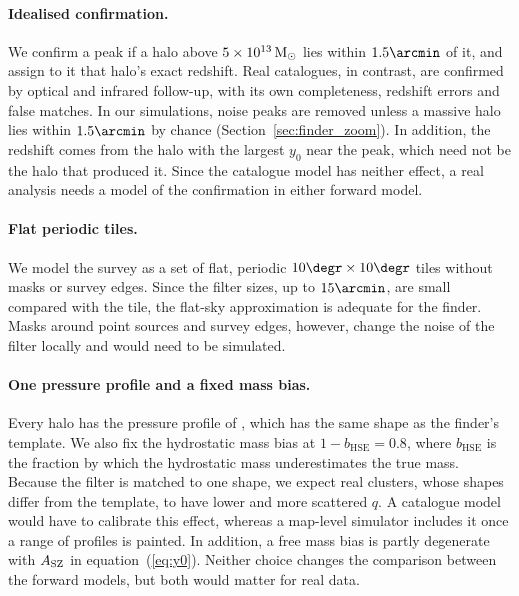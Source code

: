 \paragraph*{Idealised confirmation.} We confirm a peak if a halo above $5\times10^{13}\,\mathrm{M}_\odot$ lies within
$1.5\arcmin$ of it, and assign to it that halo's exact redshift. Real catalogues, in contrast, are
confirmed by optical and infrared follow-up, with its own completeness, redshift errors and false matches.
In our simulations, noise peaks are removed unless a massive halo lies within $1.5\arcmin$ by chance (Section~\ref{sec:finder_zoom}). In addition, the redshift comes from the halo with the largest $y_0$ near the peak,
which need not be the halo that produced it. Since the catalogue model has neither effect, a real analysis
needs a model of the confirmation in either forward model.

\paragraph*{Flat periodic tiles.} We model the survey as a set of flat, periodic $10\degr\times10\degr$
tiles without masks or survey edges. Since the filter sizes, up to $15\arcmin$, are small compared with the
tile, the flat-sky approximation is adequate for the finder. Masks around point sources and survey edges,
however, change the noise of the filter locally and would need to be simulated.

\paragraph*{One pressure profile and a fixed mass bias.} Every halo has the pressure profile of
\citet{Arnaud2010}, which has the same shape as the finder's template. We also fix the hydrostatic mass bias
at $1-b_\mathrm{HSE}=0.8$, where $b_\mathrm{HSE}$ is the fraction by which the hydrostatic mass
underestimates the true mass. Because the filter is matched to one shape, we expect real clusters, whose
shapes differ from the template, to have lower and more scattered $q$. A catalogue model would have to
calibrate this effect, whereas a map-level simulator includes it once a range of profiles is painted. In
addition, a free mass bias is partly degenerate with $A_\mathrm{SZ}$ in equation~(\ref{eq:y0}). Neither choice
changes the comparison between the forward models, but both would matter for real data.


